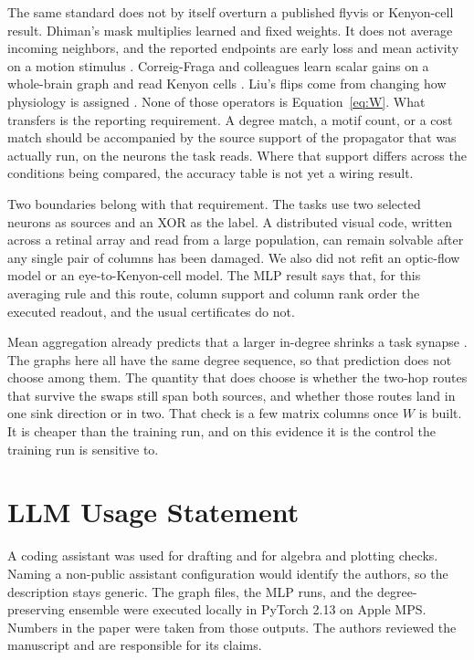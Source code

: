 \documentclass[10pt,twocolumn,letterpaper]{article}
\begin{document}
The same standard does not by itself overturn a published flyvis or Kenyon-cell result.
Dhiman's mask multiplies learned and fixed weights. It does not average incoming neighbors, and the reported endpoints are early loss and mean activity on a motion stimulus \cite{dhiman2026}.
Correig-Fraga and colleagues learn scalar gains on a whole-brain graph and read Kenyon cells \cite{correig2026}.
Liu's flips come from changing how physiology is assigned \cite{liu2026}.
None of those operators is Equation~\eqref{eq:W}.
What transfers is the reporting requirement.
A degree match, a motif count, or a cost match should be accompanied by the source support of the propagator that was actually run, on the neurons the task reads.
Where that support differs across the conditions being compared, the accuracy table is not yet a wiring result.

Two boundaries belong with that requirement.
The tasks use two selected neurons as sources and an XOR as the label.
A distributed visual code, written across a retinal array and read from a large population, can remain solvable after any single pair of columns has been damaged.
We also did not refit an optic-flow model or an eye-to-Kenyon-cell model.
The MLP result says that, for this averaging rule and this route, column support and column rank order the executed readout, and the usual certificates do not.

Mean aggregation already predicts that a larger in-degree shrinks a task synapse \cite{xu2019gin}.
The graphs here all have the same degree sequence, so that prediction does not choose among them.
The quantity that does choose is whether the two-hop routes that survive the swaps still span both sources, and whether those routes land in one sink direction or in two.
That check is a few matrix columns once $W$ is built.
It is cheaper than the training run, and on this evidence it is the control the training run is sensitive to.

\section*{LLM Usage Statement}
A coding assistant was used for drafting and for algebra and plotting checks.
Naming a non-public assistant configuration would identify the authors, so the description stays generic.
The graph files, the MLP runs, and the degree-preserving ensemble were executed locally in PyTorch 2.13 on Apple MPS.
Numbers in the paper were taken from those outputs.
The authors reviewed the manuscript and are responsible for its claims.

{\small


}
\end{document}
